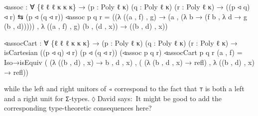 \documentclass[
  11pt,
  oneside,
  article]{memoir}
\newenvironment{Shaded}{}{}
\newcommand{\NormalTok}[1]{#1}
\newcommand{\OtherTok}[1]{\textcolor[rgb]{0.00,0.44,0.13}{#1}}
\theoremstyle{definition}
\theoremstyle{plain}
\newcommand{\0}{\textsf{0}}
\newcommand{\1}{\tn{\textsf{1}}}
\newcommand{\dnote}[1]{{\quad \color{blue}$\lozenge$\;David says:}~#1\;{\color{blue}$\lozenge$}\quad}
\begin{document}
\begin{Shaded}
\begin{Highlighting}[]
\NormalTok{◃assoc }\OtherTok{:} \OtherTok{∀} \OtherTok{\{}\NormalTok{ℓ ℓ\textquotesingle{} ℓ\textquotesingle{}\textquotesingle{} κ κ\textquotesingle{} κ\textquotesingle{}\textquotesingle{}}\OtherTok{\}}
         \OtherTok{→} \OtherTok{(}\NormalTok{p }\OtherTok{:}\NormalTok{ Poly ℓ κ}\OtherTok{)} \OtherTok{(}\NormalTok{q }\OtherTok{:}\NormalTok{ Poly ℓ\textquotesingle{} κ\textquotesingle{}}\OtherTok{)} \OtherTok{(}\NormalTok{r }\OtherTok{:}\NormalTok{ Poly ℓ\textquotesingle{}\textquotesingle{} κ\textquotesingle{}\textquotesingle{}}\OtherTok{)}
         \OtherTok{→} \OtherTok{((}\NormalTok{p ◃ q}\OtherTok{)}\NormalTok{ ◃ r}\OtherTok{)}\NormalTok{ ⇆ }\OtherTok{(}\NormalTok{p ◃ }\OtherTok{(}\NormalTok{q ◃ r}\OtherTok{))}
\NormalTok{◃assoc p q r }\OtherTok{=} 
    \OtherTok{((λ} \OtherTok{((}\NormalTok{a , f}\OtherTok{)}\NormalTok{ , g}\OtherTok{)} \OtherTok{→} \OtherTok{(}\NormalTok{a , }\OtherTok{(λ}\NormalTok{ b }\OtherTok{→} \OtherTok{(}\NormalTok{f b , }\OtherTok{λ}\NormalTok{ d }\OtherTok{→}\NormalTok{ g }\OtherTok{(}\NormalTok{b , d}\OtherTok{)))))} 
\NormalTok{    , }\OtherTok{λ} \OtherTok{((}\NormalTok{a , f}\OtherTok{)}\NormalTok{ , g}\OtherTok{)} \OtherTok{(}\NormalTok{b , }\OtherTok{(}\NormalTok{d , x}\OtherTok{))} \OtherTok{→} \OtherTok{((}\NormalTok{b , d}\OtherTok{)}\NormalTok{ , x}\OtherTok{))}

\NormalTok{◃assocCart }\OtherTok{:} \OtherTok{∀} \OtherTok{\{}\NormalTok{ℓ ℓ\textquotesingle{} ℓ\textquotesingle{}\textquotesingle{} κ κ\textquotesingle{} κ\textquotesingle{}\textquotesingle{}}\OtherTok{\}}
             \OtherTok{→} \OtherTok{(}\NormalTok{p }\OtherTok{:}\NormalTok{ Poly ℓ κ}\OtherTok{)} \OtherTok{(}\NormalTok{q }\OtherTok{:}\NormalTok{ Poly ℓ\textquotesingle{} κ\textquotesingle{}}\OtherTok{)} \OtherTok{(}\NormalTok{r }\OtherTok{:}\NormalTok{ Poly ℓ\textquotesingle{}\textquotesingle{} κ\textquotesingle{}\textquotesingle{}}\OtherTok{)}
             \OtherTok{→}\NormalTok{ isCartesian }\OtherTok{((}\NormalTok{p ◃ q}\OtherTok{)}\NormalTok{ ◃ r}\OtherTok{)} \OtherTok{(}\NormalTok{p ◃ }\OtherTok{(}\NormalTok{q ◃ r}\OtherTok{))} \OtherTok{(}\NormalTok{◃assoc p q r}\OtherTok{)}
\NormalTok{◃assocCart p q r }\OtherTok{(}\NormalTok{a , f}\OtherTok{)} \OtherTok{=} 
\NormalTok{    Iso→isEquiv }\OtherTok{(} \OtherTok{(λ} \OtherTok{((}\NormalTok{b , d}\OtherTok{)}\NormalTok{ , x}\OtherTok{)} \OtherTok{→}\NormalTok{ b , d , x}\OtherTok{)}
\NormalTok{                , }\OtherTok{(} \OtherTok{(λ} \OtherTok{(}\NormalTok{b , d , x}\OtherTok{)} \OtherTok{→}\NormalTok{ refl}\OtherTok{)} 
\NormalTok{                  , }\OtherTok{λ} \OtherTok{((}\NormalTok{b , d}\OtherTok{)}\NormalTok{ , x}\OtherTok{)} \OtherTok{→}\NormalTok{ refl}\OtherTok{))}
\end{Highlighting}
\end{Shaded}
while the left and right unitors of \texttt{◃} correspond to the fact
that \texttt{⊤} is both a left and a right unit for \texttt{Σ}-types.\dnote{It might be good to add the corresponding type-theoretic consequences here?}
\end{document}
